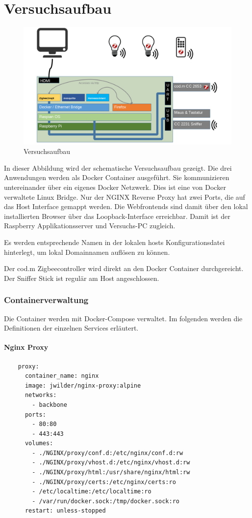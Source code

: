 \chapter{Versuchsaufbau}

\begin{figure}[H]
    \centering
    \includegraphics[width=1\textwidth]{media/Versuchsaufbau/image1.png}
    \caption{Versuchsaufbau}
  \end{figure}

In dieser Abbildung wird der schematische Versuchsaufbau gezeigt. Die drei Anwendungen werden als Docker Container ausgeführt. Sie kommunizieren
untereinander über ein eigenes Docker Netzwerk. Dies ist eine von Docker verwaltete Linux Bridge. Nur der NGINX Reverse Proxy hat zwei Ports, die
auf das Host Interface gemappt werden. Die Webfrontends sind damit über den lokal installierten Browser über das Loopback-Interface erreichbar. Damit ist der Raspberry Applikationsserver
und Versuchs-PC zugleich.

Es werden entsprechende Namen in der lokalen \grqq hosts \grqq{} Konfigurationsdatei hinterlegt, um lokal Domainnamen auflösen zu können.

Der cod.m Zigbeecontroller wird direkt an den Docker Container durchgereicht. Der Sniffer Stick ist regulär am Host angeschlossen. 

\subsection{Containerverwaltung}

Die Container werden mit \grqq Docker-Compose \grqq{} verwaltet. Im folgenden werden die Definitionen der einzelnen Services erläutert.

\subsubsection{Nginx Proxy}
\begin{lstlisting}
    proxy:
      container_name: nginx
      image: jwilder/nginx-proxy:alpine
      networks:
        - backbone
      ports:
        - 80:80
        - 443:443
      volumes:
        - ./NGINX/proxy/conf.d:/etc/nginx/conf.d:rw
        - ./NGINX/proxy/vhost.d:/etc/nginx/vhost.d:rw
        - ./NGINX/proxy/html:/usr/share/nginx/html:rw
        - ./NGINX/proxy/certs:/etc/nginx/certs:ro
        - /etc/localtime:/etc/localtime:ro
        - /var/run/docker.sock:/tmp/docker.sock:ro
      restart: unless-stopped
\end{lstlisting}

